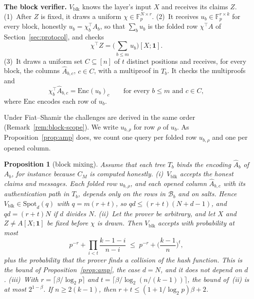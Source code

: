 \documentclass[conference,compsoc]{IEEEtran}
\newcommand{\para}[1]{\par\noindent\textbf{#1}\quad}
\newcommand{\T}{\top}
\newcommand{\F}{\mathbb{F}_p}
\newcommand{\enc}{\mathrm{Enc}}
\theoremstyle{plain}
\newtheorem{proposition}{Proposition}
\theoremstyle{definition}
\theoremstyle{remark}
\begin{document}
\para{The block verifier.} $V_{\mathrm{blk}}$ knows the layer's input $X$ and receives its claims
$Z$.
(1)~After $Z$ is fixed, it draws a uniform $\chi\in\F^{N\times r}$.
(2)~It receives $u_b\in\F^{r\times k}$ for every block, honestly $u_b=\chi_b^\T A_b$, so that
$\sum_bu_b$ is the folded row $\chi^\T A$ of Section~\ref{sec:protocol}, and checks
\begin{equation}
  \chi^\T Z=\Big(\sum_{b\le m}u_b\Big)[X;\mathbf 1].
  \label{eq:block-freivalds}
\end{equation}
(3)~It draws a uniform set $C\subseteq[n]$ of $t$ distinct positions and receives, for every block,
the columns $\hat A_{b,c}$, $c\in C$, with a multiproof in $T_b$. It checks the multiproofs and
\begin{equation}
  \chi_b^\T\hat A_{b,c}=\enc(u_b)_c\qquad\text{for every }b\le m\text{ and }c\in C,
  \label{eq:block-columns}
\end{equation}
where $\enc$ encodes each row of $u_b$.

\noindent Under Fiat--Shamir the challenges are derived in the same order
(Remark~\ref{rem:block-scope}). We write $u_{b,\rho}$ for row $\rho$ of $u_b$. As
Proposition~\ref{prop:amp} does, we count one query per folded row $u_{b,\rho}$ and one per opened
column.

\begin{proposition}[block mixing]
\label{prop:block}
Assume that each tree $T_b$ binds the encoding $\hat A_b$ of $A_b$, for instance because $C_M$ is
computed honestly.
(i)~$V_{\mathrm{blk}}$ accepts the honest claims and messages. Each folded row $u_{b,\rho}$, and each
opened column $\hat A_{b,c}$ with its authentication path in $T_b$, depends only on the rows in
$\mathcal B_b$ and on salts. Hence $V_{\mathrm{blk}}\in\mathrm{Spot}_d(q)$ with $q=m(r+t)$, so
$qd\le(r+t)(N+d-1)$, and $qd=(r+t)N$ if $d$ divides $N$.
(ii)~Let the prover be arbitrary, and let $X$ and $Z\neq A[X;\mathbf 1]$ be fixed before $\chi$ is
drawn. Then $V_{\mathrm{blk}}$ accepts with probability at most
\[
  p^{-r}+\prod_{i<t}\frac{k-1-i}{n-i}\;\le\;p^{-r}+\Big(\frac{k-1}{n}\Big)^{t},
\]
plus the probability that the prover finds a collision of the hash function. This is the bound of
Proposition~\ref{prop:amp}, the case $d=N$, and it does not depend on $d$.
(iii)~With $r=\lceil\beta/\log_2p\rceil$ and $t=\lceil\beta/\log_2(n/(k-1))\rceil$, the bound
of~(ii) is at most $2^{1-\beta}$. If $n\ge2(k-1)$, then $r+t\le(1+1/\log_2p)\beta+2$.
\end{proposition}
\end{document}
